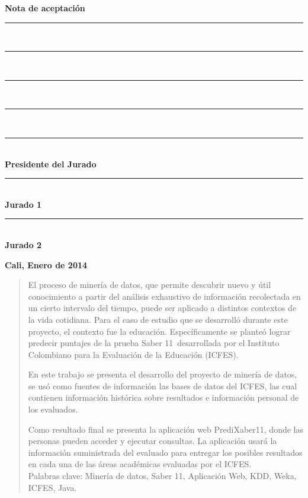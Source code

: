 \thispagestyle{fancy}
\setcounter{page}{3}

\begin{huge}
\textbf{Nota de aceptación}
\end{huge} 
\vfill
\begin{Large}
\begin{flushright}
\rule{100mm}{0.05mm}\\
\rule{100mm}{0.05mm}\\
\rule{100mm}{0.05mm}\\
\rule{100mm}{0.05mm}\\
\rule{100mm}{0.05mm}\\
\textbf{Presidente
del Jurado}\\[2.0cm]
\rule{100mm}{0.05mm}\\\textbf{Jurado 1}\vfill
\rule{100mm}{0.05mm}\\\textbf{Jurado 2}\vfill
\end{flushright}
\begin{flushleft}
\large \textbf{Cali, Enero de 2014}
\end{flushleft}
\end{Large}
\newpage


\begin{abstract}
\thispagestyle{fancy}
\setcounter{page}{4}
\justifying
El proceso de minería de datos, que permite descubrir nuevo y útil conocimiento a partir del análisis exhaustivo de información recolectada en un cierto intervalo del tiempo, puede ser aplicado a distintos contextos de la vida cotidiana. Para el caso de estudio que se desarrolló durante este proyecto, el contexto fue la educación. Específicamente se planteó lograr predecir puntajes de la prueba Saber 11\degree \ desarrollada por el Instituto Colombiano para la Evaluación de la Educación (ICFES).

En este trabajo se presenta el desarrollo del proyecto de minería de datos, se usó como fuentes de información las bases de datos del ICFES, las cual contienen información histórica sobre resultados e información personal de los evaluados.

Como resultado final se presenta la aplicación web PrediXaber11, donde las personas pueden acceder y ejecutar consultas. La aplicación usará la información suministrada del evaluado para entregar los posibles resultados en cada una de las áreas académicas evaluadas por el ICFES.\\

Palabras clave: Minería de datos, Saber 11\degree, Aplicación Web, KDD, Weka, ICFES, Java.
\end{abstract}
